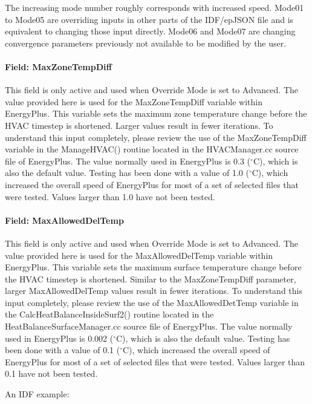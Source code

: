 The increasing mode number roughly corresponds with increased speed. Mode01 to Mode05 are overriding inputs in other parts of the IDF/epJSON file and is equivalent to changing those input directly. Mode06 and Mode07 are changing convergence parameters previously not available to be modified by the user.

\paragraph{Field: MaxZoneTempDiff}\label{max-zone-temp-diff}

This field is only active and used when Override Mode is set to Advanced. The value provided here is used for the MaxZoneTempDiff variable within EnergyPlus. This variable sets the maximum zone temperature change before the HVAC timestep is shortened. Larger values result in fewer iterations. To understand this input completely, please review the use of the MaxZoneTempDiff variable in the ManageHVAC() routine located in the HVACManager.cc source file of EnergyPlus. The value normally used in EnergyPlus is 0.3 ($^\circ$C), which is also the default value. Testing has been done with a value of 1.0 ($^\circ$C), which increased the overall speed of EnergyPlus for most of a set of selected files that were tested. Values larger than 1.0 have not been tested.

\paragraph{Field: MaxAllowedDelTemp}\label{max-allowed-del-temp}

This field is only active and used when Override Mode is set to Advanced. The value provided here is used for the MaxAllowedDelTemp variable within EnergyPlus. This variable sets the maximum surface temperature change before the HVAC timestep is shortened. Similar to the MaxZoneTempDiff parameter, larger MaxAllowedDelTemp values result in fewer iterations. To understand this input completely, please review the use of the MaxAllowedDetTemp variable in the CalcHeatBalanceInsideSurf2() routine located in the HeatBalanceSurfaceManager.cc source file of EnergyPlus. The value normally used in EnergyPlus is 0.002 ($^\circ$C), which is also the default value. Testing has been done with a value of 0.1 ($^\circ$C), which increased the overall speed of EnergyPlus for most of a set of selected files that were tested. Values larger than 0.1 have not been tested.


An IDF example:

